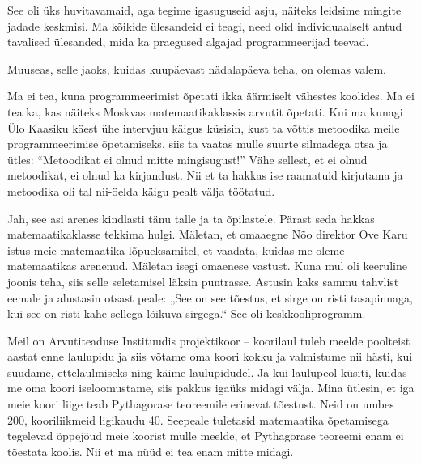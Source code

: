 
See oli üks huvitavamaid, aga tegime igasuguseid asju, näiteks leidsime mingite jadade keskmisi. Ma kõikide ülesandeid ei teagi, need olid individuaalselt antud tavalised ülesanded, mida ka praegused algajad 
programmeerijad teevad.

Muuseas, selle jaoks, kuidas kuupäevast nädalapäeva teha, on olemas valem. 


Ma ei tea, kuna programmeerimist õpetati ikka äärmiselt vähestes koolides. Ma ei 
tea ka, kas näiteks Moskvas matemaatikaklassis arvutit õpetati. Kui ma kunagi
Ülo Kaasiku käest ühe intervjuu käigus küsisin, 
kust ta võttis metoodika meile programmeerimise õpetamiseks, siis ta vaatas 
mulle suurte silmadega otsa ja ütles: \enquote{Metoodikat ei olnud mitte 
mingisugust!} Vähe sellest, et ei olnud metoodikat, ei olnud ka kirjandust. 
Nii et ta hakkas ise raamatuid kirjutama ja metoodika oli tal nii-öelda 
käigu pealt välja töötatud.


Jah, see asi arenes kindlasti tänu talle ja ta õpilastele. Pärast 
seda hakkas matemaatikaklasse tekkima hulgi. Mäletan, et omaaegne Nõo direktor Ove 
Karu istus meie matemaatika lõpueksamitel, et vaadata, kuidas me 
oleme matemaatikas arenenud. Mäletan isegi omaenese vastust. Kuna mul oli 
keeruline joonis teha, siis selle seletamisel läksin puntrasse. Astusin kaks 
sammu tahvlist eemale ja alustasin otsast peale: „See on see tõestus, et 
sirge on risti tasapinnaga, kui see on risti kahe sellega lõikuva sirgega.“ See 
oli keskkooliprogramm. 

Meil on Arvutiteaduse Instituudis 
projektikoor – koorilaul tuleb meelde poolteist aastat enne laulupidu ja siis 
võtame oma koori kokku ja valmistume nii hästi, kui suudame, ettelaulmiseks ning 
käime laulupidudel. Ja kui laulupeol küsiti, kuidas me oma koori 
iseloomustame, siis pakkus igaüks midagi välja. Mina ütlesin, et iga meie koori 
liige teab Pythagorase teoreemile erinevat tõestust. Neid on umbes 200, 
kooriliikmeid ligikaudu 40. Seepeale tuletasid matemaatika 
õpetamisega tegelevad õppejõud meie koorist mulle meelde, et 
Pythagorase teoreemi enam ei tõestata koolis. Nii et ma nüüd ei tea enam mitte 
midagi.

